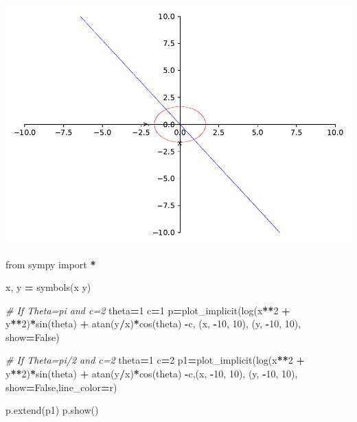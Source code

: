 \documentclass[
]{book}
\newenvironment{Shaded}{\begin{snugshade}}{\end{snugshade}}
\newcommand{\CommentTok}[1]{\textcolor[rgb]{0.56,0.35,0.01}{\textit{#1}}}
\newcommand{\DecValTok}[1]{\textcolor[rgb]{0.00,0.00,0.81}{#1}}
\newcommand{\ImportTok}[1]{#1}
\newcommand{\NormalTok}[1]{#1}
\newcommand{\OperatorTok}[1]{\textcolor[rgb]{0.81,0.36,0.00}{\textbf{#1}}}
\newcommand{\StringTok}[1]{\textcolor[rgb]{0.31,0.60,0.02}{#1}}
\newcommand{\VariableTok}[1]{\textcolor[rgb]{0.00,0.00,0.00}{#1}}
\theoremstyle{definition}
\theoremstyle{definition}
\theoremstyle{definition}
\theoremstyle{definition}
\theoremstyle{remark}
\begin{document}
\includegraphics{ConformalMapping_files/figure-latex/unnamed-chunk-59-3.pdf}

\begin{Shaded}
\begin{Highlighting}[]
\ImportTok{from}\NormalTok{ sympy }\ImportTok{import} \OperatorTok{*}

\NormalTok{x, y }\OperatorTok{=}\NormalTok{ symbols(}\StringTok{\textquotesingle{}x y\textquotesingle{}}\NormalTok{)}

\CommentTok{\# If Theta=pi and c=2}
\NormalTok{theta}\OperatorTok{=}\DecValTok{1}
\NormalTok{c}\OperatorTok{=}\DecValTok{1}
\NormalTok{p}\OperatorTok{=}\NormalTok{plot\_implicit(log(x}\OperatorTok{**}\DecValTok{2} \OperatorTok{+}\NormalTok{ y}\OperatorTok{**}\DecValTok{2}\NormalTok{)}\OperatorTok{*}\NormalTok{sin(theta) }\OperatorTok{+}\NormalTok{ atan(y}\OperatorTok{/}\NormalTok{x)}\OperatorTok{*}\NormalTok{cos(theta) }\OperatorTok{{-}}\NormalTok{c,}
\NormalTok{(x, }\OperatorTok{{-}}\DecValTok{10}\NormalTok{, }\DecValTok{10}\NormalTok{), (y, }\OperatorTok{{-}}\DecValTok{10}\NormalTok{, }\DecValTok{10}\NormalTok{), show}\OperatorTok{=}\VariableTok{False}\NormalTok{)}

\CommentTok{\# If Theta=pi/2 and c=2}
\NormalTok{theta}\OperatorTok{=}\DecValTok{1}
\NormalTok{c}\OperatorTok{=}\DecValTok{2}
\NormalTok{p1}\OperatorTok{=}\NormalTok{plot\_implicit(log(x}\OperatorTok{**}\DecValTok{2} \OperatorTok{+}\NormalTok{ y}\OperatorTok{**}\DecValTok{2}\NormalTok{)}\OperatorTok{*}\NormalTok{sin(theta) }\OperatorTok{+}\NormalTok{ atan(y}\OperatorTok{/}\NormalTok{x)}\OperatorTok{*}\NormalTok{cos(theta) }\OperatorTok{{-}}\NormalTok{c,(x, }\OperatorTok{{-}}\DecValTok{10}\NormalTok{, }\DecValTok{10}\NormalTok{), (y, }\OperatorTok{{-}}\DecValTok{10}\NormalTok{, }\DecValTok{10}\NormalTok{), show}\OperatorTok{=}\VariableTok{False}\NormalTok{,line\_color}\OperatorTok{=}\StringTok{\textquotesingle{}r\textquotesingle{}}\NormalTok{)}

\NormalTok{p.extend(p1)}
\NormalTok{p.show()}
\end{Highlighting}
\end{Shaded}
\end{document}
